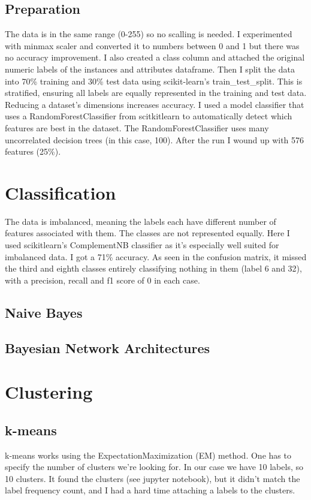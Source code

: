 \documentclass[12pt]{report}
\begin{document}
\subsection{Preparation}
The data is in the same range (0-255) so no scalling is needed. I experimented with minmax scaler and converted it to numbers between 0 and 1 but there was no accuracy improvement.
I also created a class column and attached the original numeric labels of the instances and attributes dataframe. 
Then I split the data into 70\% training and 30\% test data using scikit-learn's \parencite{scikitlearn} train\_test\_split. This is stratified, ensuring all labels are equally represented in the training and test data.
Reducing a dataset's dimensions increases accuracy. I used a model classifier that uses a RandomForestClassifier from scitkit\-learn to automatically detect which features are best in the dataset. The RandomForestClassifier uses many uncorrelated decision trees (in this case, 100). After the run I wound up with 576 features (25\%).


\section{Classification}
The data is imbalanced, meaning the labels each have different number of features associated with them. The classes are not represented equally. Here I used scikit\-learn's ComplementNB classifier as it's especially well suited for imbalanced data. I got a 71\% accuracy. As seen in the confusion matrix, it missed the third and eighth classes entirely classifying nothing in them (label 6 and 32), with a precision, recall and f1 score of 0 in each case.

\subsection{Naive Bayes}
\subsection{Bayesian Network Architectures}

\section{Clustering}
\subsection{k-means}
k-means works using the Expectation\-Maximization (EM) method. One has to specify the number of clusters we're looking for. In our case we have 10 labels, so 10 clusters. It found the clusters (see jupyter notebook), but it didn't match the label frequency count, and I had a hard time attaching a labels to the clusters.
\end{document}
